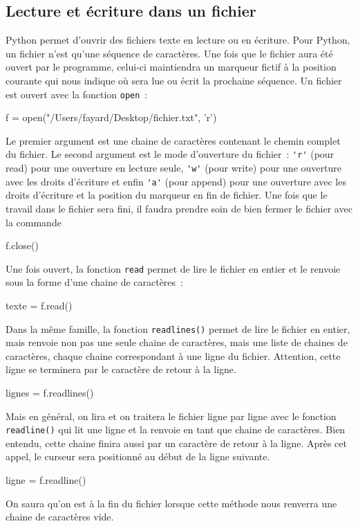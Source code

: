 \documentclass{magnoliaold}
\begin{document}
\subsection{Lecture et écriture dans un fichier}

Python permet d'ouvrir des fichiers texte en lecture ou en écriture. Pour Python, un
fichier n'est qu'une séquence de caractères. Une fois que le fichier aura été ouvert
par le programme, celui-ci maintiendra un marqueur fictif à la position courante qui
nous indique où sera lue ou écrit la prochaine séquence. Un fichier est ouvert avec la
fonction \verb!open!~:

\begin{pythoncode}
f = open("/Users/fayard/Desktop/fichier.txt", 'r')
\end{pythoncode}
\noindent
Le premier argument est une chaine de caractères contenant le chemin complet du fichier.
Le second argument est le mode d'ouverture du fichier~: \verb_'r'_ (pour read)
pour une ouverture en lecture seule, \verb_'w'_ (pour write)
pour une ouverture avec les droits d'écriture et enfin \verb_'a'_ (pour append)
pour une ouverture avec les droits d'écriture et la position du marqueur en fin
de fichier. Une fois que le travail dans le fichier sera fini, il faudra prendre soin
de bien fermer le fichier avec la commande
\begin{pythoncode}
f.close()
\end{pythoncode}

\medskip
Une fois ouvert, la fonction \verb!read! permet de lire le fichier en entier et le renvoie sous la forme
d'une chaine de caractères~:
\begin{pythoncode}
texte = f.read()
\end{pythoncode}
Dans la même famille, la fonction \verb!readlines()! permet de lire le fichier en entier,
mais renvoie non pas une seule chaine de caractères, mais une liste de chaines
de caractères, chaque chaine correspondant à une ligne du fichier. Attention, cette
ligne se terminera par le caractère de retour à la ligne.
\begin{pythoncode}
lignes = f.readlines()
\end{pythoncode}
Mais en général, on lira et on traitera le fichier ligne par ligne avec le fonction
\verb!readline()! qui lit une ligne et la renvoie en tant que chaine de caractères.
Bien entendu, cette chaine finira aussi par un caractère de retour à la ligne. Après
cet appel, le curseur sera positionné au début de la ligne suivante.
\begin{pythoncode}
ligne = f.readline()
\end{pythoncode}
On saura qu'on est à la fin du fichier lorsque cette méthode nous renverra une chaine
de caractères vide.\\
\end{document}
